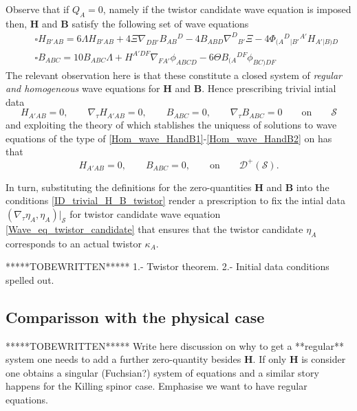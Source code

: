 \documentclass[10pt,a4paper]{article}
\theoremstyle{plain}
\def\bmB{{\bm B}}
\def\bmH{{\bm H}}
\begin{document}
{Observe that if $Q_{A}=0$, namely if the twistor candidate wave equation is imposed then,
$\bmH$ and $\bmB$ satisfy the following set of wave equations
\begin{subequations}
\begin{eqnarray}
  && \square H_{B'AB} = 6 \Lambda H_{B'AB} + 4 \Xi
  \nabla_{DB'}B_{AB}{}^{D}  -4 B_{ABD} \nabla^{D}{}_{B'}\Xi   -4 \Phi_{(A}{}^{D}{}_{|B'}{}^{A'}H_{A'|B)D}
   \label{Hom_wave_HandB1} \\
 && \square B_{ABC} = 10 B_{ABC} \Lambda + H^{A'DF} \nabla_{FA'}\phi _{ABCD}  -6 \Theta B_{(A}{}^{DF}\phi
_{BC)DF}  \label{Hom_wave_HandB2}
\end{eqnarray}
\end{subequations}
The relevant observation here is that these
constitute a closed system of \emph{regular and homogeneous}
wave equations for $\bmH$ and $\bmB$.
Hence prescribing trivial intial data
\[
H_{A'AB}=0, \qquad \nabla_\tau H_{A'AB}=0, \qquad B_{ABC}=0, \qquad \nabla_\tau B_{ABC}=0 \qquad \text{on} \qquad \mathcal{S}
\]
and exploiting the theory of \cite{} which stablishes the
uniquess of solutions to wave equations of the type of \eqref{Hom_wave_HandB1}-\eqref{Hom_wave_HandB2} on has that
\begin{equation}\label{ID_trivial_H_B_twistor}
H_{A'AB}=0, \qquad B_{ABC}=0, \qquad \text{on} \qquad \mathcal{D}^{+}(\mathcal{S}).
\end{equation}

In turn, substituting the definitions for the zero-quantities $\bmH$
and $\bmB$ into the conditions \eqref{ID_trivial_H_B_twistor} render a
prescription to fix the intial data $(\nabla_\tau \eta_A,
\eta_A)|_\mathcal{S}$ for  twistor
candidate wave equation \eqref{Wave_eq_twistor_candidate} that ensures that
the twistor candidate $\eta_A$ corresponds to an actual twistor $\kappa_A$.



\medskip

*****TOBEWRITTEN*****
1.- Twistor theorem.
2.- Initial data conditions spelled out.
\subsection{Comparisson with the physical case}

*****TOBEWRITTEN*****
Write here discussion on why to get a **regular** system one needs to add a further zero-quantity besides $\bmH$. If only $\bmH$ is consider one obtains a singular (Fuchsian?) system of equations and a similar story happens for the Killing spinor case. Emphasise we want to have regular equations.
}
\end{document}
